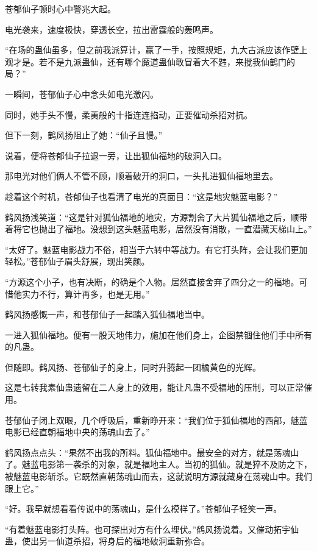 
\begin{this_body}

苍郁仙子顿时心中警兆大起。

电光袭来，速度极快，穿透长空，拉出雷霆般的轰鸣声。

“在场的蛊仙虽多，但之前我派算计，赢了一手，按照规矩，九大古派应该作壁上观才是。若不是九派蛊仙，还有哪个魔道蛊仙敢冒着大不韪，来搅我仙鹤门的局？”

一瞬间，苍郁仙子心中念头如电光激闪。

同时，她手头不慢，柔荑般的十指连连掐动，正要催动杀招对抗。

但下一刻，鹤风扬阻止了她：“仙子且慢。”

说着，便将苍郁仙子拉退一旁，让出狐仙福地的破洞入口。

那电光对他们俩人不管不顾，顺着破开的洞口，一头扎进狐仙福地里去。

趁着这个时机，苍郁仙子也看清了电光的真面目：“这是地灾魅蓝电影？”

鹤风扬浅笑道：“这是针对狐仙福地的地灾，方源割舍了大片狐仙福地之后，顺带着将它也抛出了福地。没想到这头魅蓝电影，居然没有消散，一直潜藏天梯山上。”

“太好了。魅蓝电影战力不俗，相当于六转中等战力。有它打头阵，会让我们更加轻松。”苍郁仙子眉头舒展，现出笑颜。

“方源这个小子，也有决断，的确是个人物。居然直接舍弃了四分之一的福地。可惜他实力不行，算计再多，也是无用。”

鹤风扬感慨一声，和苍郁仙子一起踏入狐仙福地当中。

一进入狐仙福地。便有一股天地伟力，施加在他们身上，企图禁锢住他们手中所有的凡蛊。

但随即。鹤风扬、苍郁仙子的身上，同时升腾起一团橘黄色的光辉。

这是七转我素仙蛊遗留在二人身上的效用，能让凡蛊不受福地的压制，可以正常催用。

苍郁仙子闭上双眼，几个呼吸后，重新睁开来：“我们位于狐仙福地的西部，魅蓝电影已经直朝福地中央的荡魂山去了。”

鹤风扬点点头：“果然不出我的所料。狐仙福地中。最安全的对方，就是荡魂山了。魅蓝电影第一袭杀的对象，就是福地主人。当初的狐仙。就是猝不及防之下，被魅蓝电影斩杀。它既然直朝荡魂山而去，这就说明方源就藏身在荡魂山中。我们跟上它。”

“好。我早就想看看传说中的荡魂山，是什么模样了。”苍郁仙子轻笑一声。

“有着魅蓝电影打头阵。也可探出对方有什么埋伏。”鹤风扬说着。又催动拓宇仙蛊，使出另一仙道杀招，将身后的福地破洞重新弥合。


\end{this_body}
